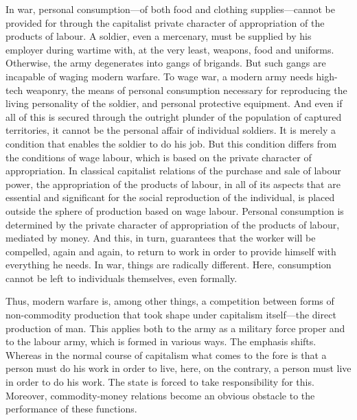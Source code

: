\documentclass[12pt,a4paper,openany]{book}
\begin{document}
In war, personal consumption—of both food and clothing supplies—cannot be provided for through the capitalist private character of appropriation of the products of labour. A soldier, even a mercenary, must be supplied by his employer during wartime with, at the very least, weapons, food and uniforms. Otherwise, the army degenerates into gangs of brigands. But such gangs are incapable of waging modern warfare. To wage war, a modern army needs high-tech weaponry, the means of personal consumption necessary for reproducing the living personality of the soldier, and personal protective equipment. And even if all of this is secured through the outright plunder of the population of captured territories, it cannot be the personal affair of individual soldiers. It is merely a condition that enables the soldier to do his job. But this condition differs from the conditions of wage labour, which is based on the private character of appropriation. In classical capitalist relations of the purchase and sale of labour power, the appropriation of the products of labour, in all of its aspects that are essential and significant for the social reproduction of the individual, is placed outside the sphere of production based on wage labour. Personal consumption is determined by the private character of appropriation of the products of labour, mediated by money. And this, in turn, guarantees that the worker will be compelled, again and again, to return to work in order to provide himself with everything he needs. In war, things are radically different. Here, consumption cannot be left to individuals themselves, even formally.

Thus, modern warfare is, among other things, a competition between forms of non-commodity production that took shape under capitalism itself—the direct production of man. This applies both to the army as a military force proper and to the labour army, which is formed in various ways. The emphasis shifts. Whereas in the normal course of capitalism what comes to the fore is that a person must do his work in order to live, here, on the contrary, a person must live in order to do his work. The state is forced to take responsibility for this. Moreover, commodity-money relations become an obvious obstacle to the performance of these functions.
\end{document}
